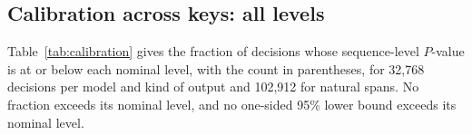 \documentclass[10pt,twocolumn]{article}
\begin{document}
\subsection{Calibration across keys: all levels}
\label{supp:calibration}

Table~\ref{tab:calibration} gives the fraction of decisions whose sequence-level $P$-value is at or
below each nominal level, with the count in parentheses, for 32{,}768 decisions per model and kind of
output and 102{,}912 for natural spans. No fraction exceeds its nominal level, and no one-sided 95\%
lower bound exceeds its nominal level.

\begin{table}[tp]
\centering
\caption{Calibration of the sequence-level $P$-value under 64 keys never used in generation, local
cohort. Entries are the percentage of decisions with a corrected $P$-value at or below the nominal
level, with the count in parentheses. The decisions share reads and keys.}
\label{tab:calibration}
\small
\setlength{\tabcolsep}{4pt}
\renewcommand{\arraystretch}{1.08}

\end{table}
\end{document}
